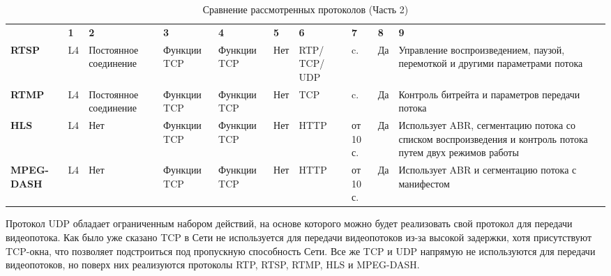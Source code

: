 \begin{table}
	\centering
	\begin{threeparttable}
		\caption{\label{tab:comparison_1} Сравнение рассмотренных протоколов (Часть 2)}
		\begin{tabular}{|>{\centering\arraybackslash}p{2.5cm}|>{\centering\arraybackslash}p{1cm}|>{\centering\arraybackslash}p{2.5cm}|>{\centering\arraybackslash}p{2.5cm}|>{\centering\arraybackslash}p{2cm}|>{\centering\arraybackslash}p{1cm}|>{\centering\arraybackslash}p{1.5cm}|>{\centering\arraybackslash}p{2.5cm}|>{\centering\arraybackslash}p{1cm}|>{\centering\arraybackslash}p{5cm}|}
			\hline
			\multirow{2}{*}{\textbf{Протокол}}& \multicolumn{9}{c|}{\textbf{Номер критерия}} \\ \cline{2-10}
			& \textbf{1}   & \textbf{2} 	   & \textbf{3} & \textbf{4} & \textbf{5} & \textbf{6} & \textbf{7} & \textbf{8} & \textbf{9} \\ \hline
			\textbf{RTSP}  	   & L4  & Постоянное соединение & Функции TCP & Функции TCP & Нет & RTP/ TCP/ UDP & 2 c. & Да &  Управление воспроизведением, паузой, перемоткой и другими параметрами потока \\ \hline
			\textbf{RTMP}  	   & L4  & Постоянное соединение & Функции TCP & Функции TCP & Нет & TCP & 5 c. & Да & Контроль битрейта и параметров передачи потока \\ \hline
			\textbf{HLS}       & L4  & Нет & Функции TCP & Функции TCP & Нет & HTTP & от 10 с. & Да & Использует ABR, сегментацию потока со списком воспроизведения и контроль потока путем двух режимов работы   \\ \hline
			\textbf{MPEG-DASH} & L4  & Нет & Функции TCP & Функции TCP & Нет & HTTP & от 10 с. & Да & Использует ABR и сегментацию потока с манифестом  \\ \hline
		\end{tabular}
	\end{threeparttable}
\end{table}

\clearpage

Протокол UDP обладает ограниченным набором действий, на основе которого можно будет реализовать свой протокол для передачи видеопотока. Как было уже сказано TCP в Сети не используется для передачи видеопотоков из-за высокой задержки, хотя присутствуют TCP-окна, что позволяет подстроиться под пропускную способность Сети. Все же TCP и UDP напрямую не используются для передачи видеопотоков, но поверх них реализуются протоколы RTP, RTSP, RTMP, HLS и MPEG-DASH. 

